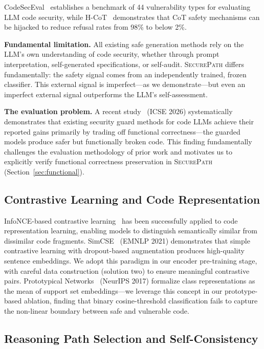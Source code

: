 \documentclass[10pt,conference]{IEEEtran}
\begin{document}
CodeSecEval~\cite{codesec} establishes a benchmark of 44 vulnerability types for evaluating LLM code security, while H-CoT~\cite{hcot} demonstrates that CoT safety mechanisms can be hijacked to reduce refusal rates from 98\% to below 2\%.

\textbf{Fundamental limitation.} All existing safe generation methods rely on the LLM's own understanding of code security, whether through prompt interpretation, self-generated specifications, or self-audit. \textsc{SecurePath} differs fundamentally: the safety signal comes from an independently trained, frozen classifier. This external signal is imperfect---as we demonstrate---but even an imperfect external signal outperforms the LLM's self-assessment.

\textbf{The evaluation problem.} A recent study~\cite{rethinking} (ICSE 2026) systematically demonstrates that existing security guard methods for code LLMs achieve their reported gains primarily by trading off functional correctness---the guarded models produce safer but functionally broken code. This finding fundamentally challenges the evaluation methodology of prior work and motivates us to explicitly verify functional correctness preservation in \textsc{SecurePath} (Section~\ref{sec:functional}).

\subsection{Contrastive Learning and Code Representation}

InfoNCE-based contrastive learning~\cite{infonce} has been successfully applied to code representation learning, enabling models to distinguish semantically similar from dissimilar code fragments. SimCSE~\cite{simcse} (EMNLP 2021) demonstrates that simple contrastive learning with dropout-based augmentation produces high-quality sentence embeddings. We adopt this paradigm in our encoder pre-training stage, with careful data construction (solution two) to ensure meaningful contrastive pairs. Prototypical Networks~\cite{protonet} (NeurIPS 2017) formalize class representations as the mean of support set embeddings---we leverage this concept in our prototype-based ablation, finding that binary cosine-threshold classification fails to capture the non-linear boundary between safe and vulnerable code.

\subsection{Reasoning Path Selection and Self-Consistency}
\end{document}
